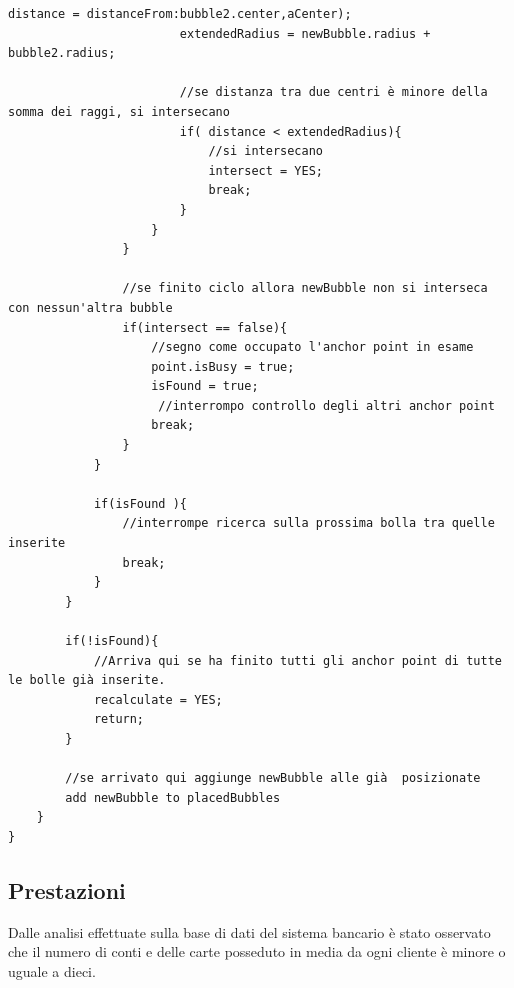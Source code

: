 \begin{lstlisting}[label=algo:3,caption=calculateOriginForBubbles,breaklines=true,  commentstyle=\color{CadetBlue}]
                        distance = distanceFrom:bubble2.center,aCenter);
                        extendedRadius = newBubble.radius + bubble2.radius;

                        //se distanza tra due centri è minore della somma dei raggi, si intersecano
                        if( distance < extendedRadius){
                            //si intersecano
                            intersect = YES;
                            break;
                        }
                    }
                }
                
                //se finito ciclo allora newBubble non si interseca con nessun'altra bubble
                if(intersect == false){
                    //segno come occupato l'anchor point in esame
                    point.isBusy = true;
                    isFound = true;
                     //interrompo controllo degli altri anchor point
                    break;
                }
            }

            if(isFound ){
                //interrompe ricerca sulla prossima bolla tra quelle inserite
                break;
            }
        }

        if(!isFound){
            //Arriva qui se ha finito tutti gli anchor point di tutte le bolle già inserite.
            recalculate = YES;
            return;
        }

        //se arrivato qui aggiunge newBubble alle già  posizionate
        add newBubble to placedBubbles
    }
}
\end{lstlisting}


\subsection{Prestazioni}
Dalle analisi effettuate sulla base di dati del sistema bancario è stato osservato che il numero di conti e delle carte posseduto in media da ogni cliente è minore o uguale a dieci.

